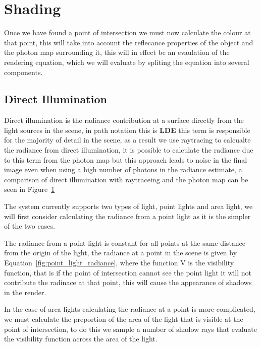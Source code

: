 \section{Shading}
Once we have found a point of intersection we must now calculate the colour at that point, this will take into account the
reflecance properties of the object and the photon map surrounding it, this will in effect be an evaulation of the rendering
equation, which we will evaluate by spliting the equation into several components.

\subsection{Direct Illumination}
Direct illumination is the radiance contribution at a surface directly from the light sources in the scene, in path notation
this is \textbf{LDE} this term is responsible for the majority of detail in the scene, as a result we use raytracing to calcualte
the radiance from direct illumination, it is possible to calculate the radiance due to this term from the photon map but this
approach leads to noise in the final image even when using a high number of photons in the radiance estimate, a comparison of
direct illumination with raytraceing and the photon map can be seen in Figure~\ref{fig:direct_compare}

\begin{figure}
\label{fig:direct_compare}
\end{figure}

The system currently supports two types of light, point lights and area light, we will first consider calculating the radiance
from a point light as it is the simpler of the two cases.

The radiance from a point light is constant for all points at the same distance from the origin of the light, the radiance at
a point in the scene is given by Equation~\ref{fig:point_light_radiance}, where the function V is the visibility function, that
is if the point of intersection cannot see the point light it will not contribute the radinace at that point, this will cause
the appearance of shadows in the render.

In the case of area lights calculating the radiance at a point is more complicated, we must calculate the preportion of the
area of the light that is visible at the point of intersection, to do this we sample a number of shadow rays that evaluate the
visibility function across the area of the light.

